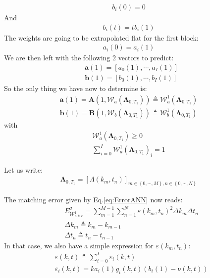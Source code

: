 \documentclass[10pt,a4paper]{article}
\begin{document}
\begin{align}
b_i(0)=0
\end{align}
And
\begin{align}
b_i(t)=t b_i(1)
\end{align}
The weights are going to be extrapolated flat for the first block:
\begin{align}
a_i(0)= a_i(1)
\end{align}
We are then left with the following 2 vectors to predict:
\begin{align}
&\boldsymbol{a}(1) = \left[ a_0(1), \cdots, a_I(1) \right]\\
&\boldsymbol{b}(1) = \left[ b_0(1), \cdots, b_I(1) \right]
\end{align}
So the only thing we have now to determine is: 
\begin{align}
\boldsymbol{a}(1) = \boldsymbol{A}(1,\mathcal{W}_a(\boldsymbol{\Lambda}_{0,T_1})) \triangleq \mathcal{W}_a^1(\boldsymbol{\Lambda}_{0,T_1}) \\
\boldsymbol{b}(1) = \boldsymbol{B}(1,\mathcal{W}_b(\boldsymbol{\Lambda}_{0,T_1})) \triangleq \mathcal{W}_b^1(\boldsymbol{\Lambda}_{0,T_1})
\end{align}
with
\begin{align}
\mathcal{W}_a^1(\boldsymbol{\Lambda}_{0,T_1})\geq 0\\
\sum_{i=0}^I\mathcal{W}_a^1(\boldsymbol{\Lambda}_{0,T_1})_i = 1
\end{align}


Let us write:
\begin{align}
\boldsymbol{\Lambda}_{0,T_1} = \left[ \Lambda(k_m,t_n) \right]_{m\in \left\lbrace 0, \cdots, M \right\rbrace, n\in \left\lbrace 0, \cdots, N \right\rbrace}
\end{align}

The matching error given by Eq.\ref{eq:ErrorANN} now reads:
\begin{align}
&E^2_{\mathcal{W}_{a,b,c}^1}= \sum_{m=1}^{M-1}\sum_{n=1}^{N} \varepsilon(k_m,t_n)^2 \Delta k_m \Delta t_n\\
&\Delta k_m \triangleq k_m-k_{m-1}\\
&\Delta t_n \triangleq t_n-t_{n-1}
\end{align}
In that case, we also have a simple expression for $\varepsilon(k_m,t_n)$:
\begin{align}
&\varepsilon(k,t) \triangleq \sum_{i=0}^{I}\varepsilon_i(k,t)\\
&\varepsilon_i(k,t) = k a_i(1) g_i(k,t) \left(b_i(1) - \nu(k,t) \right)
\end{align}
\end{document}
